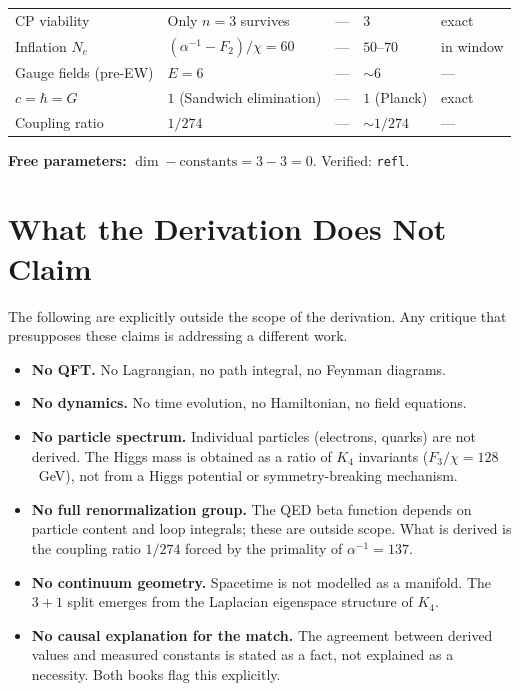 \documentclass[11pt,a4paper]{article}
\theoremstyle{definition}
\begin{document}
\begin{center}
\begin{tabular}{@{}lllll@{}}
CP viability               & Only $n=3$ survives           & ---                      & $3$     & exact \\
Inflation $N_e$            & $(\alpha^{-1} - F_2)/\chi = 60$ & ---                   & $50$--$70$ & in window \\
Gauge fields (pre-EW)      & $E = 6$                       & ---                      & $\sim 6$ & --- \\
$c = \hbar = G$            & $1$ (Sandwich elimination)    & ---                      & $1$ (Planck) & exact \\
Coupling ratio             & $1/274$                       & ---                      & $\sim 1/274$ & --- \\
\bottomrule
\end{tabular}
\end{center}

\medskip
\noindent
\textbf{Free parameters:} $\dim - \text{constants} = 3 - 3 = 0$.  Verified: \texttt{refl}.

\section{What the Derivation Does Not Claim}
\label{sec:nonclaims}

The following are explicitly outside the scope of the derivation.  Any
critique that presupposes these claims is addressing a different work.

\begin{itemize}[nosep, leftmargin=1.4em]
\item \textbf{No QFT.}  No Lagrangian, no path integral, no Feynman diagrams.
\item \textbf{No dynamics.}  No time evolution, no Hamiltonian, no field equations.
\item \textbf{No particle spectrum.}  Individual particles (electrons, quarks) are
  not derived.  The Higgs mass is obtained as a ratio of $K_4$ invariants
  ($F_3/\chi = 128$~GeV), not from a Higgs potential or symmetry-breaking
  mechanism.
\item \textbf{No full renormalization group.}  The QED beta function depends on
  particle content and loop integrals; these are outside scope.  What is derived
  is the coupling ratio $1/274$ forced by the primality of $\alpha^{-1} = 137$.
\item \textbf{No continuum geometry.}  Spacetime is not modelled as a manifold.
  The $3{+}1$ split emerges from the Laplacian eigenspace structure of $K_4$.
\item \textbf{No causal explanation for the match.}  The agreement between derived
  values and measured constants is stated as a fact, not explained as a necessity.
  Both books flag this explicitly.
\end{itemize}
\end{document}
